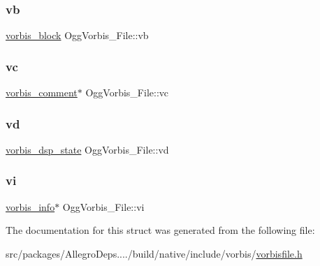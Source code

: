 \subsubsection{\texorpdfstring{vb}{vb}}
{\footnotesize\ttfamily \hyperlink{structvorbis__block}{vorbis\+\_\+block} Ogg\+Vorbis\+\_\+\+File\+::vb}

\mbox{\label{struct_ogg_vorbis___file_a4467850c72aed93fe0a70e8f1fd6f20e}} 
\subsubsection{\texorpdfstring{vc}{vc}}
{\footnotesize\ttfamily \hyperlink{structvorbis__comment}{vorbis\+\_\+comment}$\ast$ Ogg\+Vorbis\+\_\+\+File\+::vc}

\mbox{\label{struct_ogg_vorbis___file_acb9d38719f54642d1a39f24203b466d6}} 
\subsubsection{\texorpdfstring{vd}{vd}}
{\footnotesize\ttfamily \hyperlink{structvorbis__dsp__state}{vorbis\+\_\+dsp\+\_\+state} Ogg\+Vorbis\+\_\+\+File\+::vd}

\mbox{\label{struct_ogg_vorbis___file_aa5586b939d7c31c8eec83cf1380b45a6}} 
\subsubsection{\texorpdfstring{vi}{vi}}
{\footnotesize\ttfamily \hyperlink{structvorbis__info}{vorbis\+\_\+info}$\ast$ Ogg\+Vorbis\+\_\+\+File\+::vi}



The documentation for this struct was generated from the following file\+:\begin{DoxyCompactItemize}
\item 
src/packages/\+Allegro\+Deps..../build/native/include/vorbis/\hyperlink{vorbisfile_8h}{vorbisfile.\+h}\end{DoxyCompactItemize}
